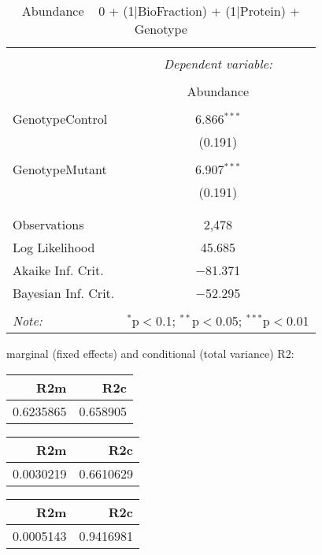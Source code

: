 \documentclass[11pt]{report}
\begin{document}
\begin{table}[!htbp] \centering 
  \caption{Abundance ~ 0 + (1|BioFraction) + (1|Protein) + Genotype} 
  \label{} 
\begin{tabular}{@{\extracolsep{5pt}}lc} 
\\[-1.8ex]\hline 
\hline \\[-1.8ex] 
 & \multicolumn{1}{c}{\textit{Dependent variable:}} \\ 
\cline{2-2} 
\\[-1.8ex] & Abundance \\ 
\hline \\[-1.8ex] 
 GenotypeControl & 6.866$^{***}$ \\ 
  & (0.191) \\ 
  & \\ 
 GenotypeMutant & 6.907$^{***}$ \\ 
  & (0.191) \\ 
  & \\ 
\hline \\[-1.8ex] 
Observations & 2,478 \\ 
Log Likelihood & 45.685 \\ 
Akaike Inf. Crit. & $-$81.371 \\ 
Bayesian Inf. Crit. & $-$52.295 \\ 
\hline 
\hline \\[-1.8ex] 
\textit{Note:}  & \multicolumn{1}{r}{$^{*}$p$<$0.1; $^{**}$p$<$0.05; $^{***}$p$<$0.01} \\ 
\end{tabular} 
\end{table} 
marginal (fixed effects) and conditional (total variance) R2:

\begin{tabular}{r|r}
\hline
R2m & R2c\\
\hline
0.6235865 & 0.658905\\
\hline
\end{tabular}

\begin{tabular}{r|r}
\hline
R2m & R2c\\
\hline
0.0030219 & 0.6610629\\
\hline
\end{tabular}

\begin{tabular}{r|r}
\hline
R2m & R2c\\
\hline
0.0005143 & 0.9416981\\
\hline
\end{tabular}
\end{document}
